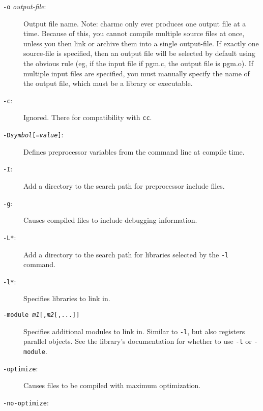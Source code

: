 \begin{description}

\item[{\tt -o} {\em output-file}:]

Output file name.  Note: charmc only ever produces one output file at
a time.  Because of this, you cannot compile multiple source files at
once, unless you then link or archive them into a single output-file.
If exactly one source-file is specified, then an output file will be
selected by default using the obvious rule (eg, if the input file if
pgm.c, the output file is pgm.o).  If multiple input files are
specified, you must manually specify the name of the output file,
which must be a library or executable.

\item[{\tt -c}:]

Ignored.  There for compatibility with {\tt cc}.

\item[{\tt -D{\em symbol}[={\em value}]}:]

Defines preprocessor variables from the command line at compile time.

\item[{\tt -I}:]

Add a directory to the search path for preprocessor include files.

\item[{\tt -g}:]

Causes compiled files to include debugging information.

\item[{\tt -L*}:]

Add a directory to the search path for libraries selected by
the {\tt -l} command.

\item[{\tt -l*}:]

Specifies libraries to link in.

\item[{\tt -module {\em m1}[,{\em m2}[,...]]}]
Specifies additional \charmpp{} modules to link in. 
Similar to {\tt -l}, but also registers \charmpp{} parallel objects.
See the library's documentation for whether to use {\tt -l} or {\tt -module}.

\item[{\tt -optimize}:]

Causes files to be compiled with maximum optimization.

\item[{\tt -no-optimize}:]


\end{description}
